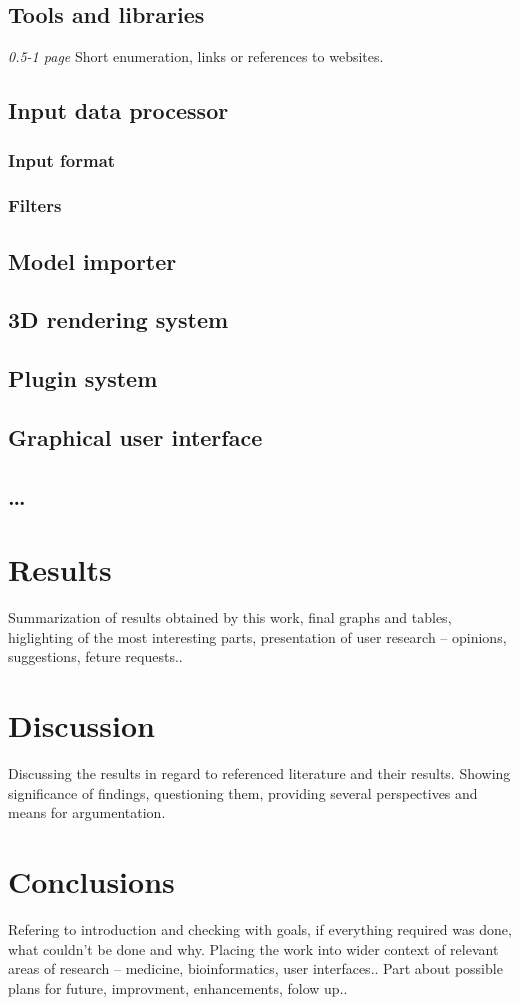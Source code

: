 \section{Tools and libraries}
\emph{0.5-1 page}
Short enumeration, links or references to websites.
\section{Input data processor}
\subsection{Input format}
\subsection{Filters}
\section{Model importer}
\section{3D rendering system}
\section{Plugin system}
\section{Graphical user interface}
\section{\ldots}
\chapter{Results}
Summarization of results obtained by this work, final graphs and tables,
higlighting of the most interesting parts, presentation of user 
research -- opinions, suggestions,
feture requests..
\chapter{Discussion}
Discussing the results in regard to referenced literature and their results.
Showing significance of findings, questioning them, providing several
perspectives and means for argumentation.
\chapter{Conclusions}
Refering to introduction and checking with goals, if everything required was
done, what couldn't be done and why. Placing the work into wider context of
relevant areas of research -- medicine, bioinformatics, user interfaces..
Part about possible plans for future, improvment, enhancements, folow up..
